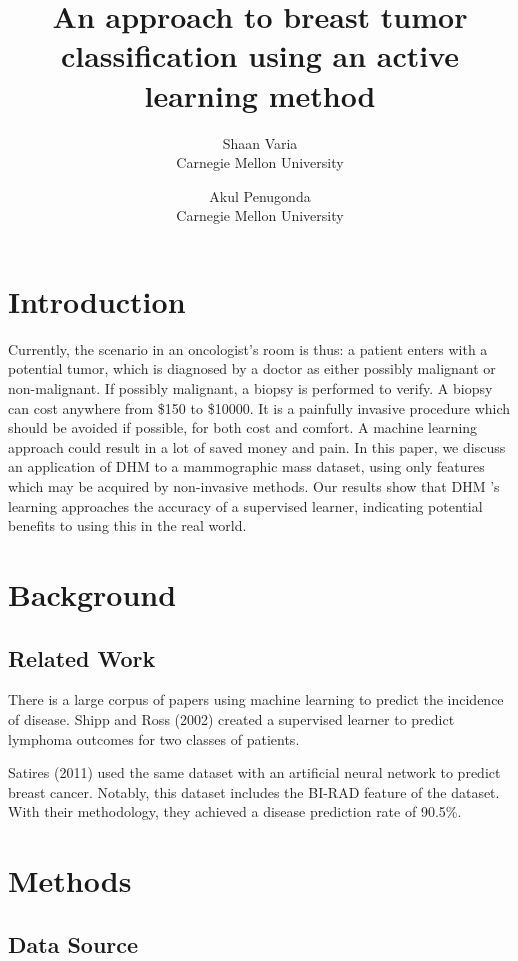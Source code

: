 \documentclass[12pt]{article}
\title{An approach to breast tumor classification using an active learning method}
\author{Shaan Varia \\ Carnegie Mellon University \and Akul Penugonda \\ Carnegie Mellon University}
\begin{document}
\maketitle

\section{Introduction}

Currently, the scenario in an oncologist's room is thus: a patient enters with a potential tumor, which is diagnosed by a doctor as either possibly malignant or non-malignant. If possibly malignant, a biopsy is performed to verify. A biopsy can cost anywhere from \$150 to \$10000. It is a painfully invasive procedure which should be avoided if possible, for both cost and comfort. A machine learning approach could result in a lot of saved money and pain. In this paper, we discuss an application of DHM to a mammographic mass dataset, using only features which may be acquired by non-invasive methods.  Our results show that DHM 's learning approaches the accuracy of a supervised learner, indicating potential benefits to using this in the real world.

\section{Background}



\subsection{Related Work}

There is a large corpus of papers using machine learning to predict the incidence of disease. Shipp and Ross (2002) created a supervised learner to predict lymphoma outcomes for two classes of patients. 

Satires (2011) used the same dataset with an artificial neural network to predict breast cancer. Notably, this dataset includes the BI-RAD feature of the dataset. With their methodology, they achieved a disease prediction rate of 90.5\%. 

\section{Methods}

\subsection{Data Source}
\end{document}
